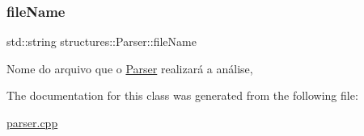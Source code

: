\subsubsection{\texorpdfstring{file\+Name}{fileName}}
{\footnotesize\ttfamily std\+::string structures\+::\+Parser\+::file\+Name}

Nome do arquivo que o \hyperlink{classstructures_1_1Parser}{Parser} realizará a análise, 

The documentation for this class was generated from the following file\+:\begin{DoxyCompactItemize}
\item 
\hyperlink{parser_8cpp}{parser.\+cpp}\end{DoxyCompactItemize}
